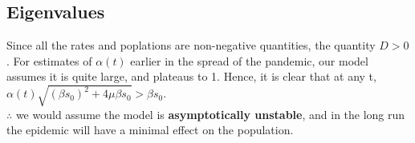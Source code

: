 \documentclass{article}
\begin{document}
\subsection{Eigenvalues}
Since all the rates and poplations are non-negative quantities, the quantity $D > 0$.
For estimates of $\alpha(t)$ earlier in the spread of the pandemic, 
our model assumes it is quite large, and plateaus to 1. Hence, it is clear that at any t,
$\alpha(t) \sqrt{\left( \beta s_0 \right)^2 + 4\mu \beta s_0} > \beta s_0$. \\
$\therefore$ we would assume the model is \textbf{asymptotically unstable}, 
and in the long run the epidemic will have a minimal effect on the population.
\end{document}
